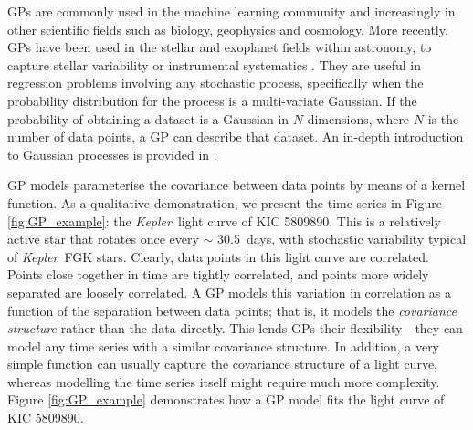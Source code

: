 \documentclass[a4paper,fleqn,usenatbib,useAMS]{mnras}
\newcommand{\Kepler}{{\it Kepler}}
\newcommand{\kepler}{\Kepler}
\newcommand{\eg}{{\it e.g.}}
\newcommand{\kepexample}{5809890}
\newcommand{\kepexampleperiod}{30.5}
\begin{document}
GPs are commonly used in the machine learning community and increasingly
in other scientific fields such as biology, geophysics and cosmology.
More recently, GPs have been used in the stellar and exoplanet fields within
astronomy, to capture stellar variability or instrumental systematics
\citep[see \eg][]{Gibson2012, Haywood2014, Dawson2014, Barclay2015,
Haywood2015, Evans2015, Rajpaul2015, Czekala2015, Vanderburg2015, Rajpaul2016,
Aigrain2016, Littlefair2017}.
They are useful in regression problems involving any stochastic process,
specifically when the probability distribution for the process is a
multi-variate Gaussian.
If the probability of obtaining a dataset is a Gaussian in $N$ dimensions,
where $N$ is the number of data points, a GP can describe that dataset.
An in-depth introduction to Gaussian processes is provided in
\citet{Rasmussen2005}.

GP models parameterise the covariance between data points by means of a
kernel function.
As a qualitative demonstration, we present the time-series in Figure
\ref{fig:GP_example}: the \kepler\ light curve of KIC \kepexample.
This is a relatively active star that rotates once every $\sim$
\kepexampleperiod\ days, with stochastic variability typical of \kepler\ FGK
stars.
Clearly, data points in this light curve are correlated.
Points close together in time are tightly correlated, and points more
widely separated are loosely correlated.
A GP models this variation in correlation as a function of the separation
between data points; that is, it models the {\it covariance structure} rather
than the data directly.
This lends GPs their flexibility---they can model any time
series with a similar covariance structure.
In addition, a very simple function can usually capture the covariance
structure of a light curve, whereas modelling the time series itself
might require much more complexity.
Figure \ref{fig:GP_example} demonstrates how a GP model fits the light curve of
KIC \kepexample.
\end{document}
